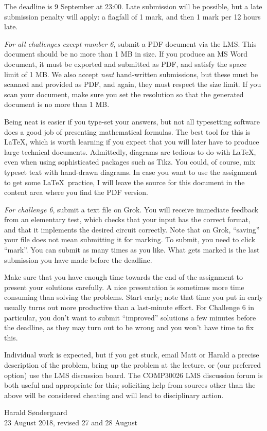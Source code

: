 \documentclass[12pt]{article}
\begin{document}
The deadline is 9 September at 23:00.
Late submission will be possible, but a late submission penalty will
apply: a flagfall of 1 mark, and then 1 mark per 12 hours late.

\emph{For all challenges except number 6}, submit a PDF document via the LMS.
This document should be no more than 1 MB in size.
If you produce an MS Word document, it must be exported
and submitted as PDF, and satisfy the space limit of 1 MB.
We also accept \emph{neat} hand-written submissions, but these must be
scanned and provided as PDF, and again, they must respect the size limit.
If you scan your document, make sure you set the resolution so that
the generated document is no more than 1 MB.

Being neat is easier if you type-set your answers, but not all
typesetting software does a good job of presenting mathematical formulas.
The best tool for this is \LaTeX, which is worth learning if you expect
that you will later have to produce large technical documents.
Admittedly, diagrams are tedious to do with \LaTeX,
even when using sophisticated packages such as Tikz.
You could, of course, mix typeset text with hand-drawn diagrams.
In case you want to use the assignment to get some \LaTeX\ practice,
I will leave the source for this document in the
content area where you find the PDF version.

\emph{For challenge 6}, submit a text file on Grok.
You will receive immediate feedback from an elementary test,
which checks that your input has the correct format, 
and that it implements the desired circuit correctly.
Note that on Grok, ``saving'' your file does not mean 
submitting it for marking. 
To submit, you need to click ``mark''.
You can submit as many times as you like.
What gets marked is the last submission you have made before the deadline.

Make sure that you have enough time towards the end of the assignment
to present your solutions carefully.
A nice presentation is sometimes more time consuming than solving the
problems.
Start early; note that time you put in early usually turns out more
productive than a last-minute effort.
For Challenge 6 in particular, you don't want to submit ``improved''
solutions a few minutes before the deadline, as they may turn out
to be wrong and you won't have time to fix this.

Individual work is expected, but if you get stuck, email Matt or Harald
a precise description of the problem, bring up the problem at the
lecture, or (our preferred option) use the LMS discussion board.
The COMP30026 LMS discussion forum is both useful and appropriate
for this;
soliciting help from sources other than the above
will be considered cheating and will lead to disciplinary action.

\begin{flushright}
Harald S{\o}ndergaard
\\ 23 August 2018, revised 27 and 28 August
\end{flushright}
\end{document}
